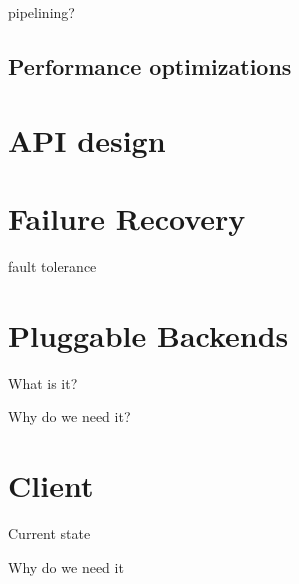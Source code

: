 pipelining?

\subsection{Performance optimizations}

\section{API design}

\section{Failure Recovery}

fault tolerance

\section{Pluggable Backends}

What is it?

Why do we need it?

\section{Client}

Current state

Why do we need it


